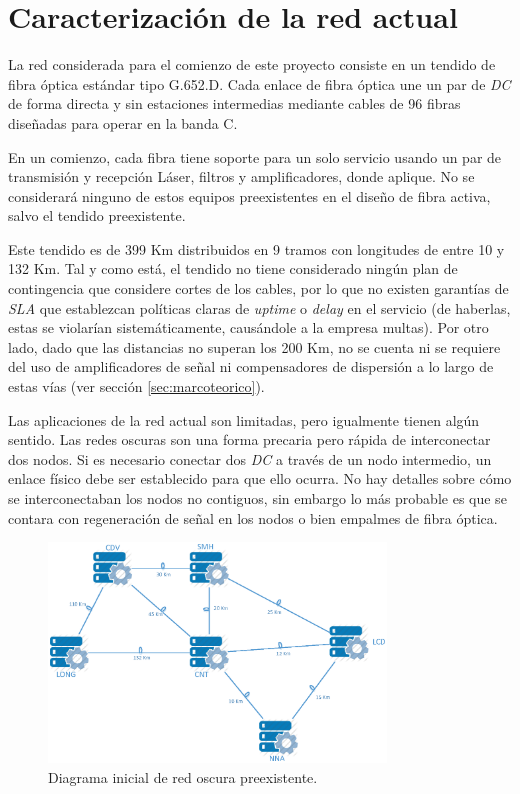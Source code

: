 \section{Caracterización de la red actual}
\label{sec:caracterizacion}

La red considerada para el comienzo de este proyecto consiste en un
tendido de fibra óptica estándar tipo G.652.D\cite{G652D}. Cada enlace
de fibra óptica une un par de \emph{DC} de forma directa y sin
estaciones intermedias mediante cables de 96 fibras diseñadas para
operar en la banda C.

En un comienzo, cada fibra tiene soporte para un solo servicio usando
un par de transmisión y recepción Láser, filtros y amplificadores,
donde aplique. No se considerará ninguno de estos equipos
preexistentes en el diseño de fibra activa, salvo el tendido
preexistente.

Este tendido es de 399 Km distribuidos en 9 tramos con longitudes de
entre 10 y 132 Km. Tal y como está, el tendido no tiene considerado
ningún plan de contingencia que considere cortes de los cables, por lo
que no existen garantías de \emph{SLA} que establezcan políticas
claras de \emph{uptime} o \emph{delay} en el servicio (de haberlas,
estas se violarían sistemáticamente, causándole a la empresa
multas). Por otro lado, dado que las distancias no superan los 200 Km,
no se cuenta ni se requiere del uso de amplificadores de señal ni
compensadores de dispersión a lo largo de estas vías (ver sección
\ref{sec:marcoteorico}).

Las aplicaciones de la red actual son limitadas, pero igualmente
tienen algún sentido. Las redes oscuras son una forma precaria pero
rápida de interconectar dos nodos. Si es necesario conectar dos
\emph{DC} a través de un nodo intermedio, un enlace físico debe ser
establecido para que ello ocurra. No hay detalles sobre cómo se
interconectaban los nodos no contiguos, sin embargo lo más probable
es que se contara con regeneración de señal en los nodos o bien
empalmes de fibra óptica.

\begin{figure}[h]
\centering
\includegraphics[width=0.8\textwidth]{Imagenes/Diagrama_Fibra_Oscura.eps}
\caption{Diagrama inicial de red oscura preexistente.}
\label{fig:diagrama_red}
\end{figure}

